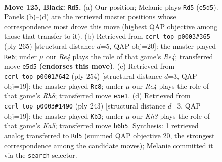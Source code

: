 \documentclass[11pt]{article}
\begin{document}
\begin{figure}[p]\centering
\begin{subfigure}{0.46\textwidth}\centering
\resizebox{\linewidth}{!}{%
\newchessgame
\chessboard[
  setfen={8/8/5K1k/4r3/8/8/8/8 b - - 35 125},
  showmover=false,
  pgfstyle=straightmove, color=movearrow, markmove={e5-d5}
]}
\caption{}
\end{subfigure}\hfill
\begin{subfigure}{0.46\textwidth}\centering
\resizebox{\linewidth}{!}{%
\newchessgame
\chessboard[
  setfen={8/8/8/4r3/3k1K2/8/6Q1/8 b - - 4 133},
  showmover=false,
  pgfstyle=straightmove, color=movearrow, markmove={e5-e6}
]}
\caption{}
\end{subfigure}
\\[4pt]
\begin{subfigure}{0.46\textwidth}\centering
\resizebox{\linewidth}{!}{%
\newchessgame
\chessboard[
  setfen={7R/6k1/8/1r6/8/4K3/8/8 w - - 0 128},
  showmover=false,
  pgfstyle=straightmove, color=movearrow, markmove={h8-c8}
]}
\caption{}
\end{subfigure}\hfill
\begin{subfigure}{0.46\textwidth}\centering
\resizebox{\linewidth}{!}{%
\newchessgame
\chessboard[
  setfen={8/8/8/8/k2K4/2r5/4Q3/8 b - - 20 122},
  showmover=false,
  pgfstyle=straightmove, color=movearrow, markmove={a4-b3}
]}
\caption{}
\end{subfigure}
\caption{\textbf{Move 125, Black: \texttt{Rd5}.} (a) Our position; Melanie plays \texttt{Rd5} (\texttt{e5d5}). Panels (b)--(d) are the retrieved master positions whose correspondence most drove this move (highest QAP objective among those that transfer to it). (b) Retrieved from \texttt{ccrl\_top\_p0003\#365} (ply 265) [structural distance $d$=5, QAP obj=20]: the master played \texttt{Re6}; under $\mu$ our \emph{Re4} plays the role of that game's \emph{Re4}; transferred move \texttt{e5d5} \textbf{(endorses this move)}. (c) Retrieved from \texttt{ccrl\_top\_p0001\#642} (ply 254) [structural distance $d$=3, QAP obj=19]: the master played \texttt{Rc8}; under $\mu$ our \emph{Re4} plays the role of that game's \emph{Rh8}; transferred move \texttt{e5e1}. (d) Retrieved from \texttt{ccrl\_top\_p0003\#1490} (ply 243) [structural distance $d$=3, QAP obj=19]: the master played \texttt{Kb3}; under $\mu$ our \emph{Kh3} plays the role of that game's \emph{Ka5}; transferred move \texttt{h6h5}. Synthesis: 1 retrieved analog transferred to \texttt{Rd5} (summed QAP objective 20, the strongest correspondence among the candidate moves); Melanie committed it via the \texttt{search} selector.}
\label{fig:thought-m249}
\end{figure}
\end{document}
